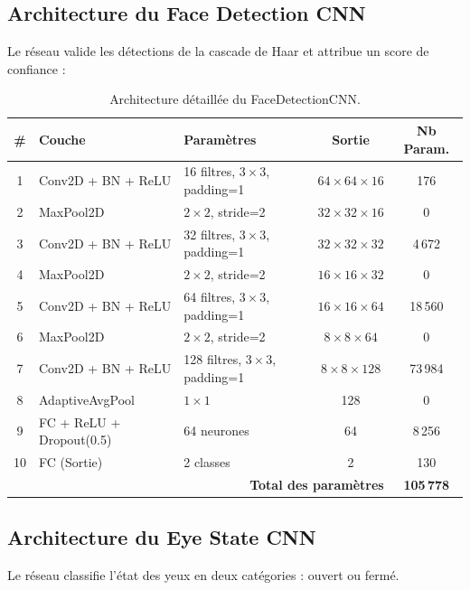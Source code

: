 \subsection{Architecture du Face Detection CNN}

Le réseau  valide les détections de la cascade de Haar et attribue un score de confiance :

\begin{table}[H]
\centering
\caption{Architecture détaillée du FaceDetectionCNN.}
\label{tab:face_cnn}
\renewcommand{\arraystretch}{1.3}
\begin{tabularx}{\textwidth}{|c|l|l|c|c|}
\hline
\rowcolor{stellantisblue!15}
\textbf{\#} & \textbf{Couche} & \textbf{Paramètres} & \textbf{Sortie} & \textbf{Nb Param.} \\
\hline
1 & Conv2D + BN + ReLU & 16 filtres, $3 \times 3$, padding=1 & $64 \times 64 \times 16$ & 176 \\
\hline
2 & MaxPool2D & $2 \times 2$, stride=2 & $32 \times 32 \times 16$ & 0 \\
\hline
3 & Conv2D + BN + ReLU & 32 filtres, $3 \times 3$, padding=1 & $32 \times 32 \times 32$ & 4\,672 \\
\hline
4 & MaxPool2D & $2 \times 2$, stride=2 & $16 \times 16 \times 32$ & 0 \\
\hline
5 & Conv2D + BN + ReLU & 64 filtres, $3 \times 3$, padding=1 & $16 \times 16 \times 64$ & 18\,560 \\
\hline
6 & MaxPool2D & $2 \times 2$, stride=2 & $8 \times 8 \times 64$ & 0 \\
\hline
7 & Conv2D + BN + ReLU & 128 filtres, $3 \times 3$, padding=1 & $8 \times 8 \times 128$ & 73\,984 \\
\hline
8 & AdaptiveAvgPool & $1 \times 1$ & 128 & 0 \\
\hline
9 & FC + ReLU + Dropout(0.5) & 64 neurones & 64 & 8\,256 \\
\hline
10 & FC (Sortie) & 2 classes & 2 & 130 \\
\hline
\multicolumn{4}{|r|}{\textbf{Total des paramètres}} & \textbf{105\,778} \\
\hline
\end{tabularx}
\end{table}

\subsection{Architecture du Eye State CNN}

Le réseau  classifie l'état des yeux en deux catégories : ouvert ou fermé.

